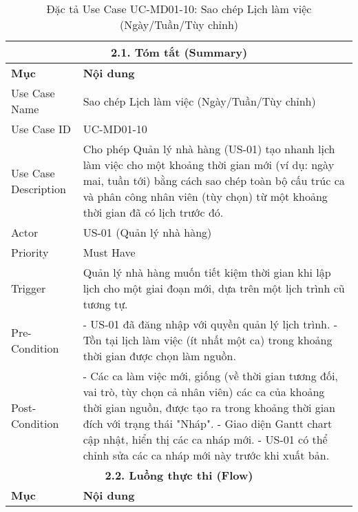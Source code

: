 \begin{longtable}{|m{4cm}|p{11cm}|}
\caption{Đặc tả Use Case UC-MD01-10: Sao chép Lịch làm việc (Ngày/Tuần/Tùy chỉnh)} \label{tab:uc_md01_10_revised} \\
\hline
\multicolumn{2}{|c|}{\textbf{2.1. Tóm tắt (Summary)}} \\
\hline
\textbf{Mục} & \textbf{Nội dung} \\
\hline
\endhead %
\hline
\endfoot %
\hline
\endlastfoot %
Use Case Name & Sao chép Lịch làm việc (Ngày/Tuần/Tùy chỉnh) \\
\hline
Use Case ID & UC-MD01-10 \\
\hline
Use Case Description & Cho phép Quản lý nhà hàng (US-01) tạo nhanh lịch làm việc cho một khoảng thời gian mới (ví dụ: ngày mai, tuần tới) bằng cách sao chép toàn bộ cấu trúc ca và phân công nhân viên (tùy chọn) từ một khoảng thời gian đã có lịch trước đó. \\
\hline
Actor & US-01 (Quản lý nhà hàng) \\
\hline
Priority & Must Have \\
\hline
Trigger & Quản lý nhà hàng muốn tiết kiệm thời gian khi lập lịch cho một giai đoạn mới, dựa trên một lịch trình cũ tương tự. \\
\hline
Pre-Condition & - US-01 đã đăng nhập với quyền quản lý lịch trình. \newline - Tồn tại lịch làm việc (ít nhất một ca) trong khoảng thời gian được chọn làm nguồn. \\
\hline
Post-Condition & - Các ca làm việc mới, giống (về thời gian tương đối, vai trò, tùy chọn cả nhân viên) các ca của khoảng thời gian nguồn, được tạo ra trong khoảng thời gian đích với trạng thái "Nháp". \newline - Giao diện Gantt chart cập nhật, hiển thị các ca nháp mới. \newline - US-01 có thể chỉnh sửa các ca nháp mới này trước khi xuất bản. \\
\hline
\multicolumn{2}{|c|}{\textbf{2.2. Luồng thực thi (Flow)}} \\
\hline
\textbf{Mục} & \textbf{Nội dung} \\
\hline

\end{longtable}

